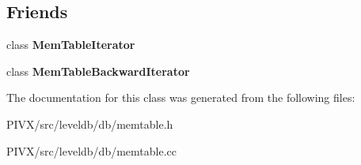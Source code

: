 \subsection*{Friends}
\begin{DoxyCompactItemize}
\item 
\mbox{\label{classleveldb_1_1_mem_table_ad6cb602bccb9af617c8cb348ae693d4a}} 
class {\bfseries Mem\+Table\+Iterator}
\item 
\mbox{\label{classleveldb_1_1_mem_table_ab6427243fb396d56604898725f9f2327}} 
class {\bfseries Mem\+Table\+Backward\+Iterator}
\end{DoxyCompactItemize}


The documentation for this class was generated from the following files\+:\begin{DoxyCompactItemize}
\item 
P\+I\+V\+X/src/leveldb/db/memtable.\+h\item 
P\+I\+V\+X/src/leveldb/db/memtable.\+cc\end{DoxyCompactItemize}
